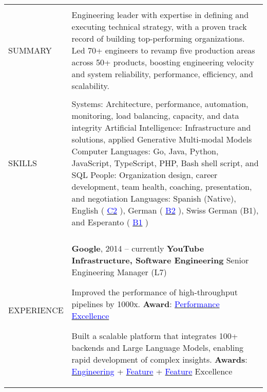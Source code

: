 \documentclass[letterpaper,10pt,oneside]{article}
\newcommand{\DatestampY}[1]{#1}
\newcommand{\itemspacing}{\vspace{0.10cm}}
\newcommand{\sref}[2]{%
    \href{https://0/local/attachments/#1}{\textcolor{blue}{#2}}%
}
\newenvironment{body}
{\par\par
\begin{longtable}{p{0.145\textwidth}p{0.81\textwidth}}}
{\par\end{longtable}\par}
\renewcommand{\section}[3]{\\[-0.35cm]\pdfbookmark[2]{#2}{#3}\\%
\raggedleft  %
{\fontsize{9.5pt}{9.5pt}\selectfont\bfseries\raggedright%
\MakeUppercase{#1}}&}
\begin{document}
\begin{body}


\section{Summary}{Summary}{PDF:Summary}

Engineering leader with expertise in defining and executing technical strategy, with a proven track record of building top-performing organizations. Led 70+ engineers to revamp five production areas across 50+ products, boosting engineering velocity and system reliability, performance, efficiency, and scalability.


\section{Skills}{Skills}{PDF:Skills}
Systems: Architecture, performance, automation, monitoring, load balancing, capacity, and data integrity\newline
Artificial Intelligence: Infrastructure and solutions, applied Generative Multi-modal Models\newline
Computer Languages: Go, Java, Python, JavaScript, TypeScript, PHP, Bash shell script, and SQL\newline
People: Organization design, career development, team health, coaching, presentation, and negotiation\newline
Languages: Spanish (Native), English (\sref{Diploma-ESOLCPE.pdf}{C2}), German (\sref{Diploma-GoetheDeutsch-B2.pdf}{B2}), Swiss German (B1), and Esperanto (\sref{Diploma-EAB-Esperanto-Meznivela.pdf}{B1})


\section{Experience}{Experience}{PDF:Experience}

\textbf{Google}, \DatestampY{2014} -- currently \vspace{0.06cm} \newline
\phantom{g}\textbf{YouTube Infrastructure, Software Engineering} \textemdash{ }Senior Engineering Manager (L7)
\begin{comp}
\item Improved the performance of high-throughput pipelines by 1000x. \textbf{Award}: \sref{Google-Award-PerformanceExcellence.pdf}{Performance Excellence}
\item Built a scalable platform that integrates 100+ backends and Large Language Models, enabling rapid development of complex insights. \textbf{Awards}: \sref{Award-EngineeringExcellenceImpact.pdf}{Engineering} + \sref{Google-Award-FeatureExcellence.pdf}{Feature} + \sref{Google-Award-FeatureExcellence2.pdf}{Feature} Excellence
\end{comp}
\itemspacing


\end{body}
\end{document}
